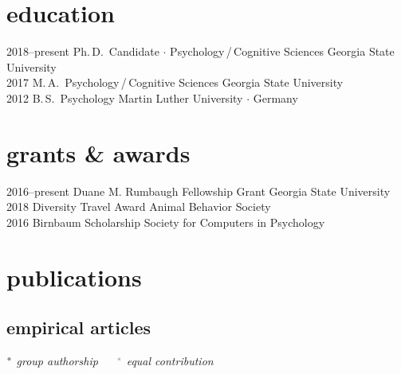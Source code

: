\documentclass[]{friggeri-cv}
\begin{document}
\section{education}

\begin{entrylist}
  \entry
    {2018--present}
    {Ph.\,D.~Candidate $\cdot$ Psychology\,/\,Cognitive Sciences}
    {Georgia State University}
    {\\[-.7cm]}
 \entry
   {2017}
   {M.\,A.~Psychology\,/\,Cognitive Sciences}
   {Georgia State University}
   {\\[-.7cm]}
  \entry
    {2012}
    {B.\,S.~Psychology}
    {Martin Luther University $\cdot$ Germany}
    {\\[-.7cm]}
\end{entrylist}


\section{grants \& awards}

\begin{entrylist}
  \entry
    {2016--present}
    {Duane M. Rumbaugh Fellowship Grant}
    {Georgia State University}
    {\\[-.7cm]}
  \entry
    {2018}
    {Diversity Travel Award}
    {Animal Behavior Society}
    {\\[-.7cm]}
  \entry
    {2016}
    {Birnbaum Scholarship}
    {Society for Computers in Psychology}
    {\\[-.7cm]}
\end{entrylist}


\section{publications}



\subsection{empirical articles}
\vspace{-.1cm}\hspace{.7cm}
{\small{} $\color{lightgray} {}^\bullet$ \emph{\color{lightgray} group authorship} $\quad$ %
{\normalsize $\color{lightgray} {}^\star$} \emph{\color{lightgray} equal contribution}}
\end{document}

